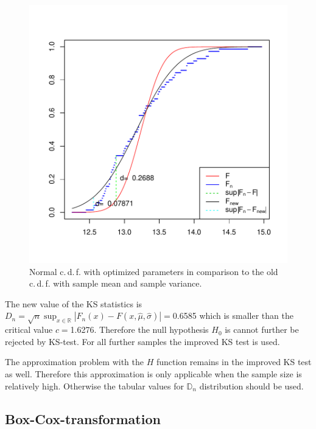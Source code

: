 \documentclass[a4paper, 12pt, titlepage, headsepline, listof = totoc, bibliography = totoc, numbers = noenddot]{scrartcl}
\newcommand{\cdf}{c.\,d.\,f. }
\begin{document}
\begin{figure}[H]
\includegraphics[width=\textwidth]{report-improvedKS}
\caption{Normal \cdf with optimized parameters in comparison to the old \cdf
with sample mean and sample variance.}
\label{fig:improvedKS}
\end{figure}

The new value of the KS statistics is $D_n=\sqrt{n}\sup_{x \in
\mathbb{R}}|F_n(x)-F(x,\hat{\mu},\hat{\sigma})|=$0.6585
which is smaller than the critical value $c=$1.6276. Therefore the null
hypothesis $H_0$ is cannot further be rejected by KS-test. For all further samples the improved KS
test is used. 


The approximation problem with the $H$ function remains in the improved KS test
as well. Therefore this approximation is only applicable when 
the sample size is relatively high. Otherwise the tabular values for
$\mathbb{D}_n$ distribution should be used. 



\subsection{Box-Cox-transformation}\label{sec:boxcox-theory}
\end{document}
